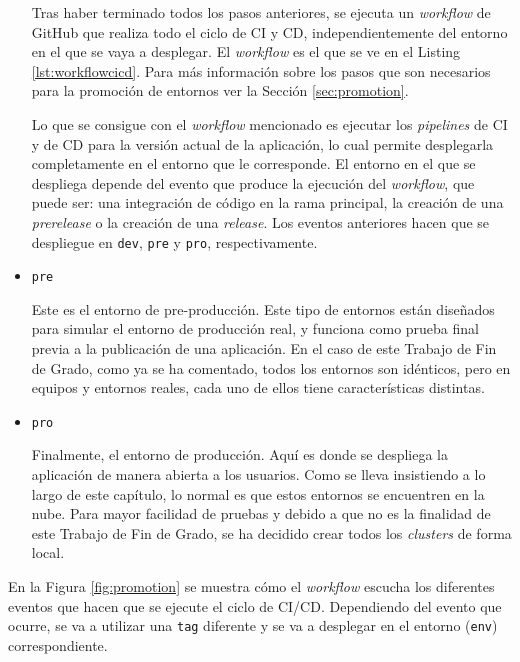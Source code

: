 \begin{itemize}
    Tras haber terminado todos los pasos anteriores, se ejecuta un \textit{workflow} de GitHub que realiza todo el ciclo de CI y CD, independientemente del entorno en el que se vaya a desplegar. El \textit{workflow} es el que se ve en el Listing \ref{lst:workflowcicd}. Para más información sobre los pasos que son necesarios para la promoción de entornos ver la Sección \ref{sec:promotion}. 

    Lo que se consigue con el \textit{workflow} mencionado es ejecutar los \textit{pipelines} de CI y de CD para la versión actual de la aplicación, lo cual permite desplegarla completamente en el entorno que le corresponde. El entorno en el que se despliega depende del evento que produce la ejecución del \textit{workflow}, que puede ser: una integración de código en la rama principal, la creación de una \textit{prerelease} o la creación de una \textit{release}. Los eventos anteriores hacen que se despliegue en \texttt{dev}, \texttt{pre} y \texttt{pro}, respectivamente.

  \item \texttt{pre}

    Este es el entorno de pre-producción. Este tipo de entornos están diseñados para simular el entorno de producción real, y funciona como prueba final previa a la publicación de una aplicación. En el caso de este Trabajo de Fin de Grado, como ya se ha comentado, todos los entornos son idénticos, pero en equipos y entornos reales, cada uno de ellos tiene características distintas.

  \item \texttt{pro}

    Finalmente, el entorno de producción. Aquí es donde se despliega la aplicación de manera abierta a los usuarios. Como se lleva insistiendo a lo largo de este capítulo, lo normal es que estos entornos se encuentren en la nube. Para mayor facilidad de pruebas y debido a que no es la finalidad de este Trabajo de Fin de Grado, se ha decidido crear todos los \textit{clusters} de forma local.

\end{itemize}

En la Figura \ref{fig:promotion} se muestra cómo el \textit{workflow} escucha los diferentes eventos que hacen que se ejecute el ciclo de CI/CD. Dependiendo del evento que ocurre, se va a utilizar una \texttt{tag} diferente y se va a desplegar en el entorno (\texttt{env}) correspondiente.

